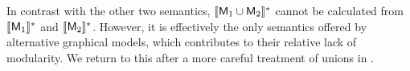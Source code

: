 \documentclass{article}
\theoremstyle{plain}
\theoremstyle{definition}
\theoremstyle{remark}
\DeclarePairedDelimiter{\UD}{\llbracket}{\rrbracket^*}
\newcommand{\sfM}{\mathsf M}
\numberwithin{equation}{section}
\begin{document}

\begin{vleftovers}

      In contrast with the other two semantics, $\UD{\sfM_1 \cup
          \sfM_2}$ cannot be calculated from $\UD{\sfM_1}$ and
        $\UD{\sfM_2}$. However, it is effectively the only semantics
        offered by alternative graphical models, which contributes to
        their relative lack of modularity. We return to this after a
        more careful treatment of unions in
        .
\end{vleftovers}
        

\end{document}
